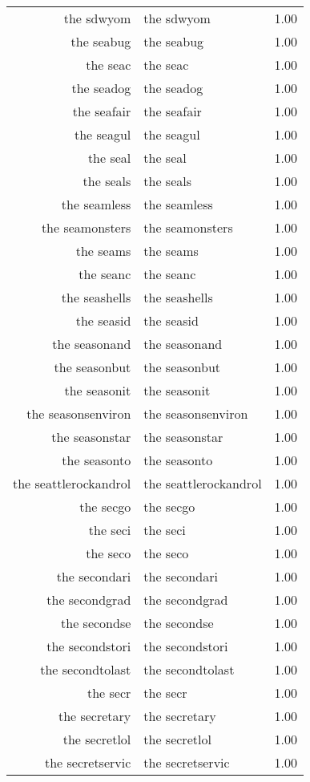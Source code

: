 \begin{table}[ht]
\begin{tabular}{rlr}
  the sdwyom & the sdwyom & 1.00 \\ 
  the seabug & the seabug & 1.00 \\ 
  the seac & the seac & 1.00 \\ 
  the seadog & the seadog & 1.00 \\ 
  the seafair & the seafair & 1.00 \\ 
  the seagul & the seagul & 1.00 \\ 
  the seal & the seal & 1.00 \\ 
  the seals & the seals & 1.00 \\ 
  the seamless & the seamless & 1.00 \\ 
  the seamonsters & the seamonsters & 1.00 \\ 
  the seams & the seams & 1.00 \\ 
  the seanc & the seanc & 1.00 \\ 
  the seashells & the seashells & 1.00 \\ 
  the seasid & the seasid & 1.00 \\ 
  the seasonand & the seasonand & 1.00 \\ 
  the seasonbut & the seasonbut & 1.00 \\ 
  the seasonit & the seasonit & 1.00 \\ 
  the seasonsenviron & the seasonsenviron & 1.00 \\ 
  the seasonstar & the seasonstar & 1.00 \\ 
  the seasonto & the seasonto & 1.00 \\ 
  the seattlerockandrol & the seattlerockandrol & 1.00 \\ 
  the secgo & the secgo & 1.00 \\ 
  the seci & the seci & 1.00 \\ 
  the seco & the seco & 1.00 \\ 
  the secondari & the secondari & 1.00 \\ 
  the secondgrad & the secondgrad & 1.00 \\ 
  the secondse & the secondse & 1.00 \\ 
  the secondstori & the secondstori & 1.00 \\ 
  the secondtolast & the secondtolast & 1.00 \\ 
  the secr & the secr & 1.00 \\ 
  the secretary & the secretary & 1.00 \\ 
  the secretlol & the secretlol & 1.00 \\ 
  the secretservic & the secretservic & 1.00 \\ 

\end{tabular}
\end{table}
